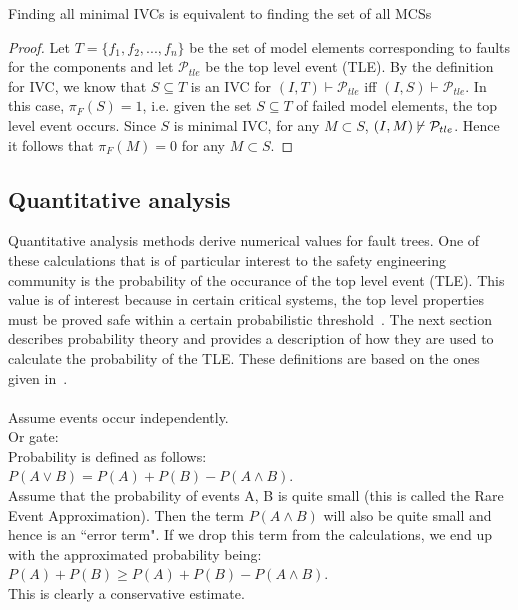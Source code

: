 \begin{theorem} Finding all minimal IVCs is equivalent to finding the set of all MCSs\\

\begin{proof} 
Let $T = \{f_1, f_2, ..., f_n\}$ be the set of model elements corresponding to faults for the components and let $\mathcal{P}_{tle}$ be the top level event (TLE). By the definition for IVC, we know that $S \subseteq T$ is an IVC for $(I, T) \vdash \mathcal{P}_{tle}$ iff $(I, S) \vdash \mathcal{P}_{tle}$. 
In this case, $\pi_F(S) = 1$, i.e. given the set $S \subseteq T$ of failed model elements, the top level event occurs. 
Since $S$ is minimal IVC, for any $M \subset S$, $(I, M) \mkern-2mu\not\mkern2mu\vdash \mathcal{P}_{tle}$. Hence it follows that $\pi_F(M) = 0$ for any $M \subset S$.
\end{proof}
\end{theorem}

\subsection{Quantitative analysis}
Quantitative analysis methods derive numerical values for fault trees. One of these calculations that is of particular interest to the safety engineering community is the probability of the occurance of the top level event (TLE). This value is of interest because in certain critical systems, the top level properties must be proved safe within a certain probabilistic threshold~\cite{SAE:ARP4761}. The next section describes probability theory and provides a description of how they are used to calculate the probability of the TLE. These definitions are based on the ones given in~\cite{RuijtersSurvey}.\\

\\
Assume events occur independently. \\

Or gate: \\
Probability is defined as follows: \\
$P(A \lor B) = P(A) + P(B) - P(A \land B)$. \\
Assume that the probability of events A, B is quite small (this is called the Rare Event Approximation). Then the term $P(A \land B)$ will also be quite small and hence is an ``error term". If we drop this term from the calculations, we end up with the approximated probability being: $P(A) + P(B) \geq P(A) + P(B) - P(A \land B)$. \\ This is clearly a conservative estimate. 

